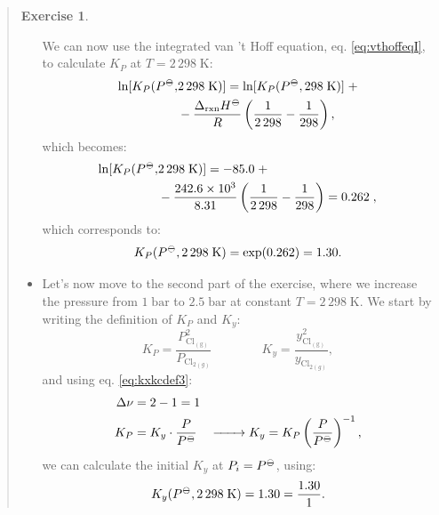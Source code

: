 \documentclass[
  9pt,
]{extbook}
\theoremstyle{definition}
\theoremstyle{definition}
\theoremstyle{definition}
\newtheorem{exercise}{Exercise}[chapter]
\theoremstyle{definition}
\theoremstyle{remark}
\begin{document}
\begin{quote}
\begin{exercise}
\begin{itemize}
  We can now use the integrated van 't Hoff equation, eq. \eqref{eq:vthoffeqI}, to calculate \(K_P\) at \(T=2\,298\;\text{K}\):
  \begin{equation}
  \begin{aligned}
  \ln [K_P (P^{-\kern-6pt{\ominus}\kern-6pt-},&2\,298\;\text{K})] = \ln [K_P (P^{-\kern-6pt{\ominus}\kern-6pt-},298\;\text{K})] \;+ \\ &-\frac{\Delta_{\text{rxn}} H^{-\kern-6pt{\ominus}\kern-6pt-}}{R} \left(\frac{1}{2\,298}-\frac{1}{298} \right),
  \end{aligned}
  \end{equation}
  which becomes:
  \begin{equation}
  \begin{aligned}
  \ln [K_P (P^{-\kern-6pt{\ominus}\kern-6pt-},&2\,298\;\text{K})] = - 85.0 \;+\\&-\frac{242.6\times 10^{3}}{8.31} \left(\frac{1}{2\,298}-\frac{1}{298} \right) = 0.262\;,
  \end{aligned}
  \end{equation}
  which corresponds to:
  \begin{equation}
  K_P (P^{-\kern-6pt{\ominus}\kern-6pt-},2\,298\;\text{K}) = \exp (0.262)=1.30.
  \end{equation}
\item
  Let's now move to the second part of the exercise, where we increase the pressure from \(1\;\text{bar}\) to \(2.5\;\text{bar}\) at constant \(T=2\,298\;\text{K}\). We start by writing the definition of \(K_P\) and \(K_y\):
  \begin{equation}
  K_P=\frac{P_\mathrm{Cl_{(g)}}^2}{P_{\mathrm{Cl}_{2(g)}}} \qquad \qquad  K_y=\frac{y_\mathrm{Cl_{(g)}}^2}{y_{\mathrm{Cl}_{2(g)}}},
  \end{equation}
  and using eq. \eqref{eq:kxkcdef3}:
  \begin{equation}
  \begin{aligned}
  \Delta \nu &= 2 - 1 = 1 \\
  K_P &= K_y \cdot \frac{P}{P^{-\kern-6pt{\ominus}\kern-6pt-}} \quad \xrightarrow \qquad K_y=K_P \left( \frac{P}{P^{-\kern-6pt{\ominus}\kern-6pt-}} \right)^{-1},
  \end{aligned}
  \end{equation}
  we can calculate the initial \(K_y\) at \(P_i=P^{-\kern-6pt{\ominus}\kern-6pt-}\), using:
  \begin{equation}
  K_y (P^{-\kern-6pt{\ominus}\kern-6pt-},2\,298\;\text{K}) = 1.30 =\frac{1.30}{1}.
  \end{equation}

\end{itemize}
\end{exercise}
\end{quote}
\end{document}
